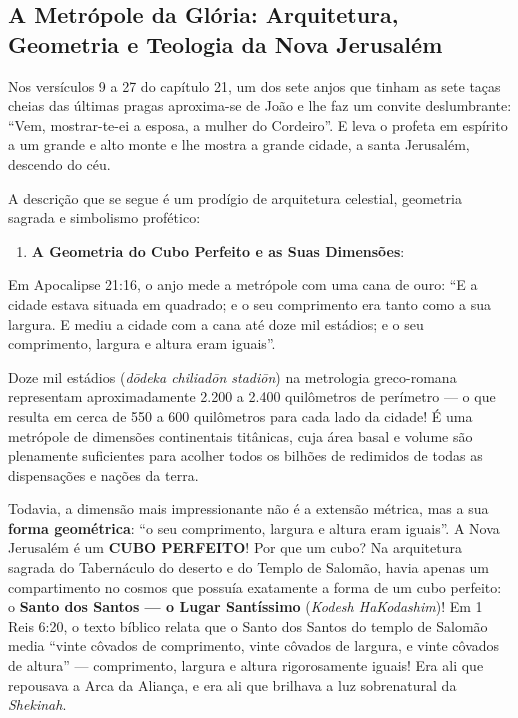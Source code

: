 \subsection{A Metrópole da Glória: Arquitetura, Geometria e Teologia da Nova Jerusalém}


Nos versículos 9 a 27 do capítulo 21, um dos sete anjos que tinham as sete taças cheias das últimas pragas aproxima-se de João e lhe faz um convite deslumbrante: ``Vem, mostrar-te-ei a esposa, a mulher do Cordeiro''. E leva o profeta em espírito a um grande e alto monte e lhe mostra a grande cidade, a santa Jerusalém, descendo do céu.

A descrição que se segue é um prodígio de arquitetura celestial, geometria sagrada e simbolismo profético:

\begin{enumerate}
  \item \textbf{A Geometria do Cubo Perfeito e as Suas Dimensões}:
\end{enumerate}

Em Apocalipse 21:16, o anjo mede a metrópole com uma cana de ouro:
``E a cidade estava situada em quadrado; e o seu comprimento era tanto como a sua largura. E mediu a cidade com a cana até doze mil estádios; e o seu comprimento, largura e altura eram iguais''.

Doze mil estádios (\textit{dōdeka chiliadōn stadiōn}) na metrologia greco-romana representam aproximadamente 2.200 a 2.400 quilômetros de perímetro — o que resulta em cerca de 550 a 600 quilômetros para cada lado da cidade! É uma metrópole de dimensões continentais titânicas, cuja área basal e volume são plenamente suficientes para acolher todos os bilhões de redimidos de todas as dispensações e nações da terra.

Todavia, a dimensão mais impressionante não é a extensão métrica, mas a sua \textbf{forma geométrica}: ``o seu comprimento, largura e altura eram iguais''.
A Nova Jerusalém é um \textbf{CUBO PERFEITO}!
Por que um cubo?
Na arquitetura sagrada do Tabernáculo do deserto e do Templo de Salomão, havia apenas um compartimento no cosmos que possuía exatamente a forma de um cubo perfeito: o \textbf{Santo dos Santos — o Lugar Santíssimo} (\textit{Kodesh HaKodashim})!
Em 1 Reis 6:20, o texto bíblico relata que o Santo dos Santos do templo de Salomão media ``vinte côvados de comprimento, vinte côvados de largura, e vinte côvados de altura'' — comprimento, largura e altura rigorosamente iguais! Era ali que repousava a Arca da Aliança, e era ali que brilhava a luz sobrenatural da \textit{Shekinah}.

